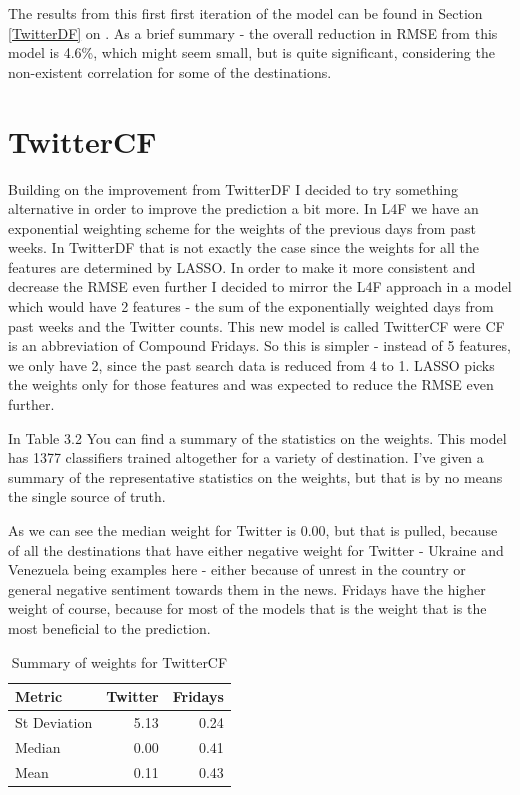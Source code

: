 \documentclass[minf,twoside,singlespacing,parskip,frontabs]{infthesis}
\begin{document}
The results from this first first iteration of the model can be found in Section \ref{TwitterDF} on \pageref{TwitterDF}. As a brief summary - the overall reduction in RMSE from this model is 4.6\%, which might seem small, but is quite significant, considering the non-existent correlation for some of the destinations.


\section{TwitterCF}
\label{sec:cf}

Building on the improvement from TwitterDF I decided to try something alternative in order to improve the prediction a bit more. In L4F we have an exponential weighting scheme for the weights of the previous days from past weeks. In TwitterDF that is not exactly the case since the weights for all the features are determined by LASSO. In order to make it more consistent and decrease the RMSE even further I decided to mirror the L4F approach in a model which would have 2 features - the sum of the exponentially weighted days from past weeks and the Twitter counts. This new model is called TwitterCF were CF is an abbreviation of Compound Fridays. So this is simpler - instead of 5 features, we only have 2, since the past search data is reduced from 4 to 1. LASSO picks the weights only for those features and was expected to reduce the RMSE even further. 


In Table 3.2 You can find a summary of the statistics on the weights. This model has 1377 classifiers trained altogether for a variety of destination. I've given a summary of the representative statistics on the weights, but that is by no means the single source of truth. 

As we can see the median weight for Twitter is 0.00, but that is pulled, because of all the destinations that have either negative weight for Twitter - Ukraine and Venezuela being examples here - either because of unrest in the country or general negative sentiment towards them in the news. Fridays have the higher weight of course, because for most of the models that is the weight that is the most beneficial to the prediction. 

\begin{table}[h]
\begin{center}
\begin{tabular}{ l | r | r }
\textbf{Metric} & \textbf{Twitter} & \textbf{Fridays}\\
\hline
St Deviation & 5.13 & 0.24\\
Median & 0.00 & 0.41\\
Mean & 0.11 & 0.43
\end{tabular}
\end{center}
\caption{Summary of weights for TwitterCF}
\end{table}
\end{document}
